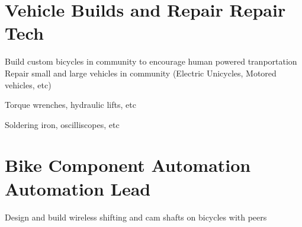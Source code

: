 \vspace{2.5ex}


\section{
    \textbf{Vehicle Builds and Repair} \newline
    Repair Tech
}{}

\vspace{-2.5ex}

\begin{detail}
    \BulletItem
    Build custom bicycles in community to encourage human powered tranportation
    \BulletItem
    Repair small and large vehicles in community (Electric Unicycles, Motored vehicles, etc)
\end{detail}

\begin{subtitle}
    \vspace{-5ex}
    {{}} 
\end{subtitle}

\vspace{-1.5ex}
{
    \vspace{-0.8ex}
    \color{cyan}\small
    {Torque wrenches, hydraulic lifts, etc}
}

{
    \vspace{-2.5ex}\hspace{3in}
    \color{cyan}\small
    {Soldering iron, oscilliscopes, etc}
}

\vspace{2.5ex}


\section{
    \textbf{Bike Component Automation} \newline
    Automation Lead
}{}

\vspace{-2.5ex}

\begin{detail}
    \BulletItem
    Design and build wireless shifting and cam shafts on bicycles with peers
\end{detail}

